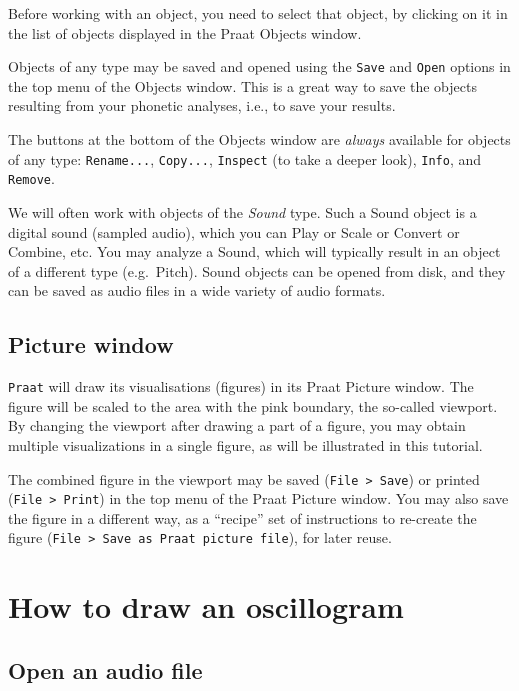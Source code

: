 \documentclass[
]{book}
\begin{document}
Before working with an object, you need to select that object, by clicking on it in the list of objects displayed in the Praat Objects window.

Objects of any type may be saved and opened using the \texttt{Save} and \texttt{Open} options in the top menu of the Objects window. This is a great way to save the objects resulting from your phonetic analyses, i.e., to save your results.

The buttons at the bottom of the Objects window are \emph{always} available for objects of any type: \texttt{Rename...}, \texttt{Copy...}, \texttt{Inspect} (to take a deeper look), \texttt{Info}, and \texttt{Remove}.

We will often work with objects of the \emph{Sound} type. Such a Sound object is a digital sound (sampled audio), which you can Play or Scale or Convert or Combine, etc. You may analyze a Sound, which will typically result in an object of a different type (e.g.~Pitch). Sound objects can be opened from disk, and they can be saved as audio files in a wide variety of audio formats.

\subsection*{Picture window}\label{picture-window}

\texttt{Praat} will draw its visualisations (figures) in its Praat Picture window. The figure will be scaled to the area with the pink boundary, the so-called viewport. By changing the viewport after drawing a part of a figure, you may obtain multiple visualizations in a single figure, as will be illustrated in this tutorial.

The combined figure in the viewport may be saved (\texttt{File\ \textgreater{}\ Save}) or printed (\texttt{File\ \textgreater{}\ Print}) in the top menu of the Praat Picture window.
You may also save the figure in a different way, as a ``recipe'' set of instructions to re-create the figure (\texttt{File\ \textgreater{}\ Save\ as\ Praat\ picture\ file}), for later reuse.

\protect{}\label{box-open}
\section{How to draw an oscillogram}\label{how-to-draw-an-oscillogram}

\subsection{Open an audio file}\label{open-an-audio-file}
\end{document}
